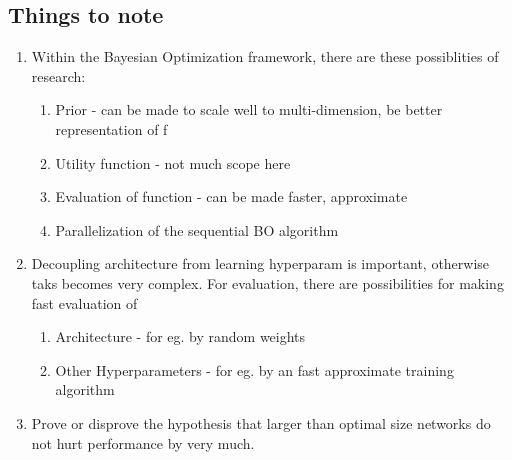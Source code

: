 \documentclass{article}
\begin{document}
\vspace{4mm}
\subsection*{Things to note}

\begin{enumerate}
\item Within the Bayesian Optimization framework, there are these possiblities of research:
\begin{enumerate}
	\item Prior - can be made to scale well to multi-dimension, be better representation of f
	\item Utility function - not much scope here
	\item Evaluation of function - can be made faster, approximate
	\item Parallelization of the sequential BO algorithm
\end{enumerate}
\item Decoupling architecture from learning hyperparam is important, otherwise taks becomes very complex. For evaluation, there are possibilities for making fast evaluation of 
\begin{enumerate}
	\item Architecture - for eg. by random weights 
	\item Other Hyperparameters - for eg. by an fast approximate training algorithm
\end{enumerate}
\item Prove or disprove the hypothesis that larger than optimal size networks do not hurt performance by very much.
\end{enumerate}

\newpage


\end{document}
